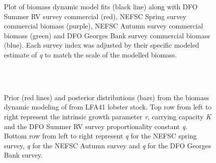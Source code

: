 \documentclass[11pt]{article}
\newcommand{\spm}{/backup/bio_data/bio.lobster/spmodelling/lfa41/}
\begin{document}
\begin{figure}
\centering
        \caption{Plot of biomass dynamic model fits (black line) along with DFO Summer RV survey commercial (red), NEFSC Spring survey commercial biomass (purple), NEFSC Autumn survey commercial biomass (green) and DFO Georges Bank survey commercial biomass (blue). Each survey index was adjusted by their specific modeled estimate of \emph{q} to match the scale of the modelled biomass.}


\end{figure}

\begin{landscape}




\begin{figure}
\centering
        \\
        \\
        \caption{Prior (red lines) and posterior distributions (bars) from the biomass dynamic modeling of from LFA41 lobster stock. Top row from left to right represent the intrinsic growth parameter \emph{r}, carrying capacity \emph{K} and the DFO Summer RV survey proportionality constant \emph{q}. Bottom row from left to right represent \emph{q} for the NEFSC spring survey, \emph{q} for the NEFSC Autumn survey and \emph{q} for the DFO Georges Bank survey. }
        
\end{figure}
     \clearpage



\end{landscape}
\end{document}

